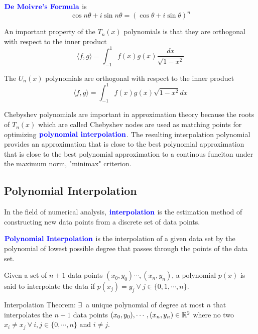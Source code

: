 \documentclass[12pt]{scrartcl}
\begin{document}
\begin{definition}
    $\textbf{\color{blue} De Moivre's Formula}$ is
    \[\cos n\theta + i\sin n\theta = (\cos \theta + i \sin \theta)^n\]
\end{definition}

\begin{note}
    An important property of the $T_n(x)$ polynomials is that they are orthogonal with respect to the inner product
    \[\langle f, g\rangle = \int_{-1}^1 f(x) g(x) \frac{dx}{\sqrt{1-x^2}}\]

    The $U_n(x)$ polynomials are orthogonal with respect to the inner product
    \[\langle f, g\rangle = \int_{-1}^1 f(x) g(x) \sqrt{1-x^2} dx\]
\end{note}

\begin{note}
    Chebyshev polynomials are important in approximation theory because the roots of $T_n(x)$ which are called Chebyshev nodes are used as matching points for optimizing $\textbf{\color{blue} polynomial interpolation}$. The resulting interpolation polynomial provides an approximation that is close to the best polynomial approximation that is close to the best polynomial approximation to a continous funciton under the maximum norm, "minimax" criterion.
\end{note}

\subsection{Polynomial Interpolation}

\begin{definition}
    In the field of numerical analysis, $\textbf{\color{blue} interpolation}$ is the estimation method of constructing new data points from a discrete set of data points.
\end{definition}

\begin{definition}
    $\textbf{\color{blue} Polynomial Interpolation}$ is the interpolation of a given data set by the polynomial of lowest possible degree that passes through the points of the data set.

    Given a set of $n+1$ data points $(x_0, y_0) \cdots , (x_n, y_n)$, a polynomial
    $p(x)$ is said to interpolate the data if $p(x_j) = y_j \ \forall \ j \in \{0,
        1, \cdots , n\}$.
\end{definition}

\begin{theorem}
    Interpolation Theorem: $\exists \ $ a unique polynomial of degree at most $n$ that interpolates the $n+1$ data points $(x_0, y_0), \cdots, (x_n, y_n) \in \mathbb R^2$ where no two $x_i \neq x_j \ \forall \ i, j \in \{0, \cdots, n\} \text{ and } i \neq j$.
\end{theorem}
\end{document}
